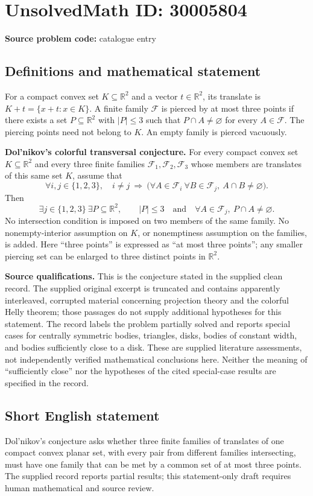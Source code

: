 \documentclass[11pt]{article}
\newcommand{\R}{\mathbb{R}}
\begin{document}
\section*{UnsolvedMath ID: 30005804}
\textbf{Source problem code:} catalogue entry
\subsection{Definitions and mathematical statement}
For a compact convex set \(K\subseteq\R^2\) and a vector \(t\in\R^2\), its translate is \(K+t=\{x+t:x\in K\}\). A finite family \(\mathcal F\) is pierced by at most three points if there exists a set \(P\subseteq\R^2\) with \(|P|\leq 3\) such that \(P\cap A\neq\varnothing\) for every \(A\in\mathcal F\). The piercing points need not belong to \(K\). An empty family is pierced vacuously.

\textbf{Dol'nikov's colorful transversal conjecture.} For every compact convex set \(K\subseteq\R^2\) and every three finite families \(\mathcal F_1,\mathcal F_2,\mathcal F_3\) whose members are translates of this same set \(K\), assume that
\[
\forall i,j\in\{1,2,3\},\quad i\neq j\ \Longrightarrow\ \bigl(\forall A\in\mathcal F_i\ \forall B\in\mathcal F_j,\ A\cap B\neq\varnothing\bigr).
\]
Then
\[
\exists j\in\{1,2,3\}\ \exists P\subseteq\R^2,\qquad |P|\leq 3\quad\text{and}\quad \forall A\in\mathcal F_j,\ P\cap A\neq\varnothing.
\]
No intersection condition is imposed on two members of the same family. No nonempty-interior assumption on \(K\), or nonemptiness assumption on the families, is added. Here ``three points'' is expressed as ``at most three points''; any smaller piercing set can be enlarged to three distinct points in \(\R^2\).

\textbf{Source qualifications.} This is the conjecture stated in the supplied clean record. The supplied original excerpt is truncated and contains apparently interleaved, corrupted material concerning projection theory and the colorful Helly theorem; those passages do not supply additional hypotheses for this statement. The record labels the problem partially solved and reports special cases for centrally symmetric bodies, triangles, disks, bodies of constant width, and bodies sufficiently close to a disk. These are supplied literature assessments, not independently verified mathematical conclusions here. Neither the meaning of ``sufficiently close'' nor the hypotheses of the cited special-case results are specified in the record.
\subsection{Short English statement}
Dol'nikov's conjecture asks whether three finite families of translates of one compact convex planar set, with every pair from different families intersecting, must have one family that can be met by a common set of at most three points. The supplied record reports partial results; this statement-only draft requires human mathematical and source review.
\end{document}
